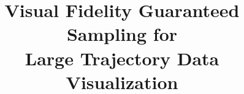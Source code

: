 \documentclass[review,journal]{vgtc}         %
\title{Visual Fidelity Guaranteed Sampling for \\ Large Trajectory Data Visualization}
\begin{document}

\maketitle









\balance
%

%
%
%


\end{document}

